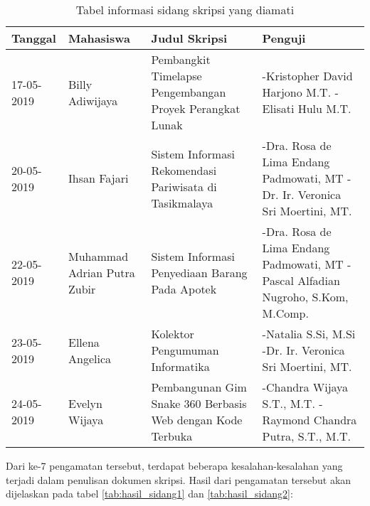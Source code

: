 \begin{table}[H]
	\renewcommand{\arraystretch}{1.5}
	\caption {Tabel informasi sidang skripsi yang diamati} 	
	\label{tab:pengamatan_sidang2}
	\begin{center}
		\begin{tabular}{|p{2 cm}|>{\raggedright} p{3.5 cm}| p{4.5 cm}| p{4.5 cm}|}
		\hline
		Tanggal & Mahasiswa & Judul Skripsi & Penguji \\ 
		\hline 
		17-05-2019 & Billy Adiwijaya & Pembangkit Timelapse Pengembangan Proyek Perangkat Lunak & -Kristopher David Harjono M.T. \newline -Elisati Hulu M.T. \newline \\ 		
		\hline
		20-05-2019 & Ihsan Fajari & Sistem Informasi Rekomendasi Pariwisata di Tasikmalaya & -Dra. Rosa de Lima Endang Padmowati, MT \newline -Dr. Ir. Veronica Sri Moertini, MT. \newline \\ 
		\hline 
		22-05-2019 & Muhammad Adrian Putra Zubir & Sistem Informasi Penyediaan Barang Pada Apotek & -Dra. Rosa de Lima Endang Padmowati, MT \newline -Pascal Alfadian Nugroho, S.Kom, M.Comp. \newline \\ 
		\hline 
		23-05-2019 & Ellena Angelica & Kolektor Pengumuman Informatika & -Natalia S.Si, M.Si \newline -Dr. Ir. Veronica Sri Moertini, MT. \newline \\ 
		\hline 
		24-05-2019 & Evelyn Wijaya & Pembangunan Gim Snake 360 Berbasis Web dengan Kode Terbuka & -Chandra Wijaya S.T., M.T. \newline -Raymond Chandra Putra, S.T., M.T. \newline \\ 
		\hline 
		\end{tabular}
	\end{center}
\end{table}

Dari ke-7 pengamatan tersebut, terdapat beberapa kesalahan-kesalahan yang terjadi dalam penulisan dokumen skripsi. Hasil dari pengamatan tersebut akan dijelaskan pada tabel \ref{tab:hasil_sidang1} dan \ref{tab:hasil_sidang2}:

